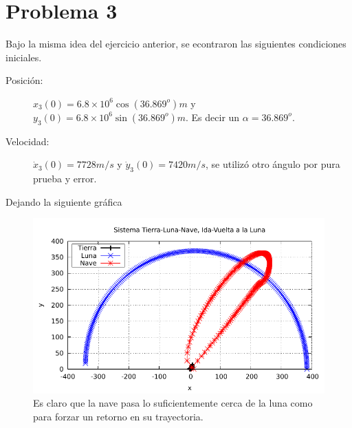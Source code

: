 \section*{Problema 3}
Bajo la misma idea del ejercicio anterior, se econtraron las siguientes condiciones iniciales.
\begin{description}
	\item[Posición: ] $x_3 (0) = 6.8\times 10^6 \cos{(36.869^o)} m$ y $y_3 (0) = 6.8\times 10^6 \sin{(36.869^o)} m.$ Es decir un $\alpha = 36.869^o$.
	\item[Velocidad: ] $\dot{x} _3 (0) = 7728 m/s$ y $\dot{y} _3 (0) = 7420m/s$, se utilizó otro ángulo por pura prueba y error. 
\end{description}
Dejando la siguiente gráfica
\begin{figure}[H]
	\centering
	\includegraphics[scale=0.8]{../img/ej5-18.pdf}
	\caption{Es claro que la nave pasa lo suficientemente cerca de la luna como para forzar un retorno en su trayectoria.}
	\label{ej5-17}
\end{figure}













